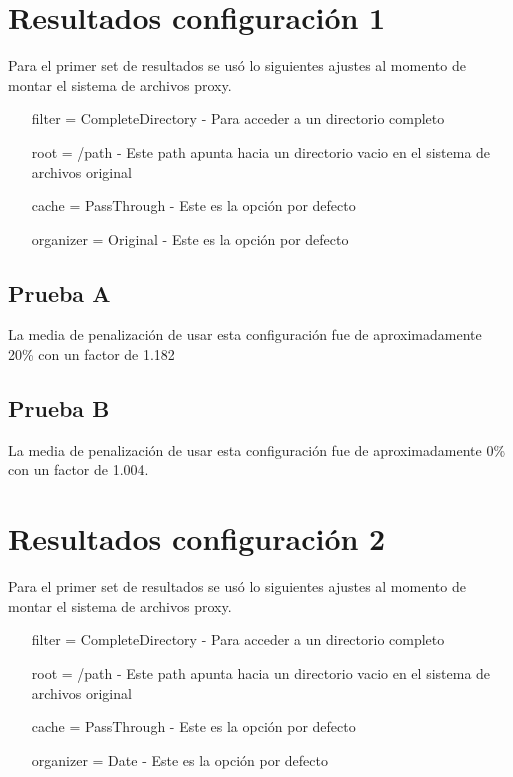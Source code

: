 \section{Resultados configuración 1}

Para el primer set de resultados se usó lo siguientes ajustes al momento de montar el sistema de archivos proxy.

\begin{itemize}
\item[filter] = CompleteDirectory - Para acceder a un directorio completo
\item[root] = /path - Este path apunta hacia un directorio vacio en el sistema de archivos original
\item[cache] = PassThrough - Este es la opción por defecto
\item[organizer] = Original - Este es la opción por defecto
\end{itemize}

\subsection{Prueba A}

La media de penalización de usar esta configuración fue de aproximadamente 20\% con un factor de 1.182


\subsection{Prueba B}

La media de penalización de usar esta configuración fue de aproximadamente 0\% con un factor de 1.004.



\section{Resultados configuración 2}

Para el primer set de resultados se usó lo siguientes ajustes al momento de montar el sistema de archivos proxy.

\begin{itemize}
\item[filter] = CompleteDirectory - Para acceder a un directorio completo
\item[root] = /path - Este path apunta hacia un directorio vacio en el sistema de archivos original
\item[cache] = PassThrough - Este es la opción por defecto
\item[organizer] = Date - Este es la opción por defecto
\end{itemize}

